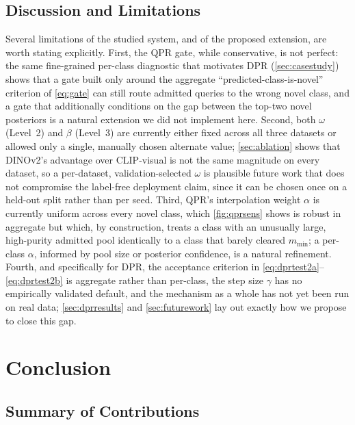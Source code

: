 \documentclass{iutbscthesis}
\begin{document}
\section{Discussion and Limitations}
\label{sec:discussion}

Several limitations of the studied system, and of the proposed extension, are worth stating explicitly. First, the QPR gate, while conservative, is not perfect: the same fine-grained per-class diagnostic that motivates DPR (\autoref{sec:casestudy}) shows that a gate built only around the aggregate ``predicted-class-is-novel'' criterion of \autoref{eq:gate} can still route admitted queries to the wrong novel class, and a gate that additionally conditions on the gap between the top-two novel posteriors is a natural extension we did not implement here. Second, both $\omega$ (Level~2) and $\beta$ (Level~3) are currently either fixed across all three datasets or allowed only a single, manually chosen alternate value; \autoref{sec:ablation} shows that DINOv2's advantage over CLIP-visual is not the same magnitude on every dataset, so a per-dataset, validation-selected $\omega$ is plausible future work that does not compromise the label-free deployment claim, since it can be chosen once on a held-out split rather than per seed. Third, QPR's interpolation weight $\alpha$ is currently uniform across every novel class, which \autoref{fig:qprsens} shows is robust in aggregate but which, by construction, treats a class with an unusually large, high-purity admitted pool identically to a class that barely cleared $m_{\min}$; a per-class $\alpha$, informed by pool size or posterior confidence, is a natural refinement. Fourth, and specifically for DPR, the acceptance criterion in \autoref{eq:dprtest2a}--\autoref{eq:dprtest2b} is aggregate rather than per-class, the step size $\gamma$ has no empirically validated default, and the mechanism as a whole has not yet been run on real data; \autoref{sec:dprresults} and \autoref{sec:futurework} lay out exactly how we propose to close this gap.


\chapter{Conclusion}
\label{chapter:conclusion}

\section{Summary of Contributions}
\end{document}
